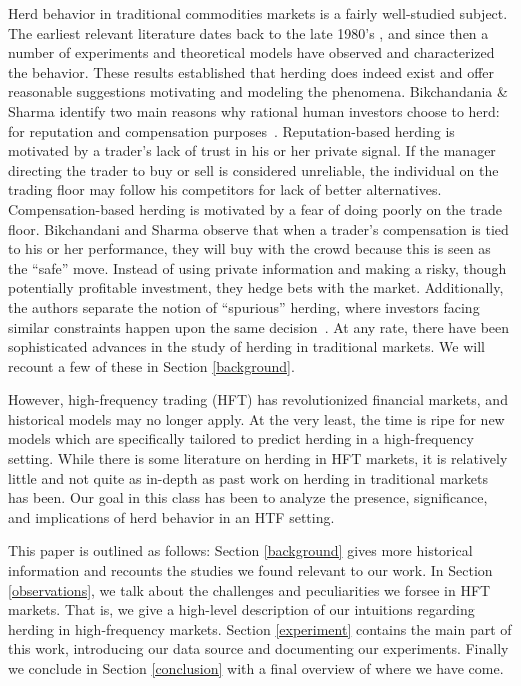 Herd behavior in traditional commodities markets is a fairly well-studied subject.
The earliest relevant literature dates back to the late 1980's \cite{bikhchandani}, and since then a number of experiments and theoretical models have observed and characterized the behavior.
These results established that herding does indeed exist and offer reasonable suggestions motivating and modeling the phenomena.
Bikchandania \& Sharma identify two main reasons why rational human investors choose to herd: for reputation and compensation purposes~\cite{bikhchandani}.
Reputation-based herding is motivated by a trader's lack of trust in his or her private signal. 
If the manager directing the trader to buy or sell is considered unreliable, the individual on the trading floor may follow his competitors for lack of better alternatives.
Compensation-based herding is motivated by a fear of doing poorly on the trade floor. 
Bikchandani and Sharma observe that when a trader's compensation is tied to his or her performance, they will buy with the crowd because this is seen as the ``safe'' move. 
Instead of using private information and making a risky, though potentially profitable investment, they hedge bets with the market.
Additionally, the authors separate the notion of ``spurious'' herding, where investors facing similar constraints happen upon the same decision~\cite[281]{bikhchandani}.
At any rate, there have been sophisticated advances in the study of herding in traditional markets.
We will recount a few of these in Section \ref{background}.

However, high-frequency trading (HFT) has revolutionized financial markets, and historical models may no longer apply.
At the very least, the time is ripe for new models which are specifically tailored to predict herding in a high-frequency setting.
While there is some literature on herding in HFT markets, it is relatively little and not quite as in-depth as past work on herding in traditional markets has been.
Our goal in this class has been to analyze the presence, significance, and implications of herd behavior in an HTF setting.

This paper is outlined as follows: Section \ref{background} gives more historical information and recounts the studies we found relevant to our work.
In Section \ref{observations}, we talk about the challenges and peculiarities we forsee in HFT markets.
That is, we give a high-level description of our intuitions regarding herding in high-frequency markets.
Section \ref{experiment} contains the main part of this work, introducing our data source and documenting our experiments.
Finally we conclude in Section \ref{conclusion} with a final overview of where we have come.
